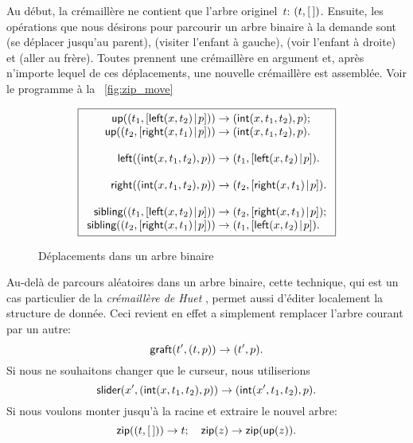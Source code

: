Au début, la crémaillère ne contient que l'arbre originel~\(t\):
\(({t},{[\,]})\). Ensuite, les opérations que nous désirons pour
parcourir un arbre binaire à la demande sont
 (se déplacer jusqu'au parent),
 (visiter l'enfant à gauche),
 (voir l'enfant à droite) et
 (aller au frère).
Toutes prennent une crémaillère en argument et, après n'importe lequel
de ces déplacements, une nouvelle crémaillère est assemblée. Voir le programme à la
\fig~\vref{fig:zip_move}
\begin{figure}
\begin{equation*}
\boxed{
\begin{array}{r@{\;}c@{\;}l}
\fun{up}(\pair{t_1}{\cons{\fun{left}(x,t_2)}{p}}) & \rightarrow &
  \pair{\fun{int}(x,t_1,t_2)}{p};\\
\fun{up}(\pair{t_2}{\cons{\fun{right}(x,t_1)}{p}}) & \rightarrow &
\pair{\fun{int}(x,t_1,t_2)}{p}.\\
\\
\fun{left}(\pair{\fun{int}(x,t_1,t_2)}{p}) & \rightarrow &
  \pair{t_1}{\cons{\fun{left}(x,t_2)}{p}}.\\
\\
\fun{right}(\pair{\fun{int}(x,t_1,t_2)}{p}) & \rightarrow &
  \pair{t_2}{\cons{\fun{right}(x,t_1)}{p}}.\\
\\
\fun{sibling}(\pair{t_1}{\cons{\fun{left}(x,t_2)}{p}}) & \rightarrow &
  \pair{t_2}{\cons{\fun{right}(x,t_1)}{p}};\\
\fun{sibling}(\pair{t_2}{\cons{\fun{right}(x,t_1)}{p}}) & \rightarrow&
  \pair{t_1}{\cons{\fun{left}(x,t_2)}{p}}.
\end{array}}
\end{equation*}
\caption{Déplacements dans un arbre binaire}
\label{fig:zip_move}
\end{figure}

Au-delà de parcours aléatoires dans un arbre binaire, cette technique,
qui est un cas particulier de la \emph{crémaillère de Huet}
\citep{Huet_1997}, permet aussi d'éditer localement la structure de
donnée.  Ceci revient en effet a simplement remplacer l'arbre courant
par un autre:
\begin{equation*}
\textsf{graft}(t',({t},{p})) \rightarrow ({t'},{p}).
\end{equation*}
Si nous ne souhaitons changer que le curseur, nous utiliserions
\begin{equation*}
\textsf{slider}(x',({\textsf{int}(x,t_1,t_2)},{p})) \rightarrow
({\textsf{int}(x',t_1,t_2)},{p}).
\end{equation*}
Si nous voulons monter jusqu'à la racine et extraire le nouvel arbre:
\begin{equation*}
\textsf{zip}(({t},{[\,]})) \rightarrow t;\quad
\textsf{zip}(z) \rightarrow \textsf{zip}(\textsf{up}(z)).
\end{equation*}

